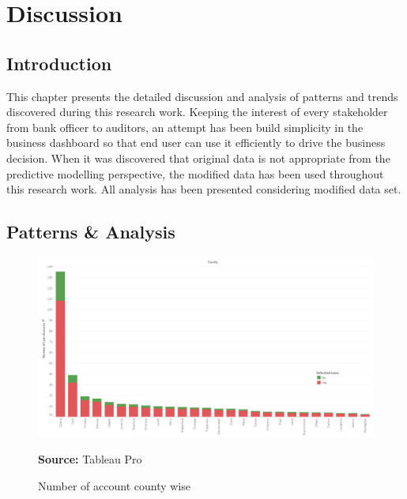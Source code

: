 %
%
%
%

\chapter{Discussion}\label{C.Discussion}

\section{Introduction}\label{S.Discussion.intro}

This chapter presents the detailed discussion and analysis of patterns and trends discovered during this research work. Keeping the interest of every stakeholder from bank officer to auditors, an attempt has been build simplicity in the business dashboard so that end user can use it efficiently to drive the business decision. When it was discovered that original data is not appropriate from the predictive modelling perspective, the modified data has been used throughout this research work. All analysis has been presented considering modified data set.

\section{Patterns \&  Analysis}

\begin{center}
\begin{figure}[!htb]
\includegraphics[width=\textwidth]{countynumber.png}
\centering
\caption{Number of account county wise}{\textbf{Source:} Tableau Pro}
\label{fig:tableaucounty}
\end{figure}
\end{center}

